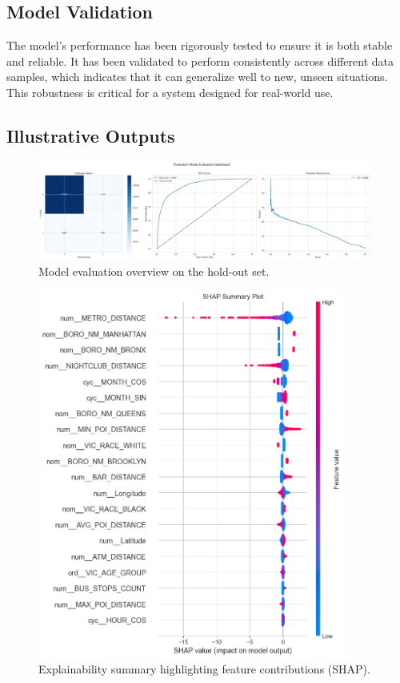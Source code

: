 \documentclass[11pt]{article}
\begin{document}
\subsection{Model Validation}
The model's performance has been rigorously tested to ensure it is both stable and reliable. It has been validated to perform consistently across different data samples, which indicates that it can generalize well to new, unseen situations. This robustness is critical for a system designed for real-world use.

\subsection{Illustrative Outputs}
\begin{figure}[H]
  \centering
  \includegraphics[width=0.98\textwidth]{LogisticRegression_evaluation_dashboard.png}
  \caption{Model evaluation overview on the hold-out set.}
\end{figure}

\begin{figure}[H]
  \centering
  \includegraphics[width=0.9\textwidth]{LogisticRegression_shap_summary.png}
  \caption{Explainability summary highlighting feature contributions (SHAP).}
\end{figure}
\end{document}
